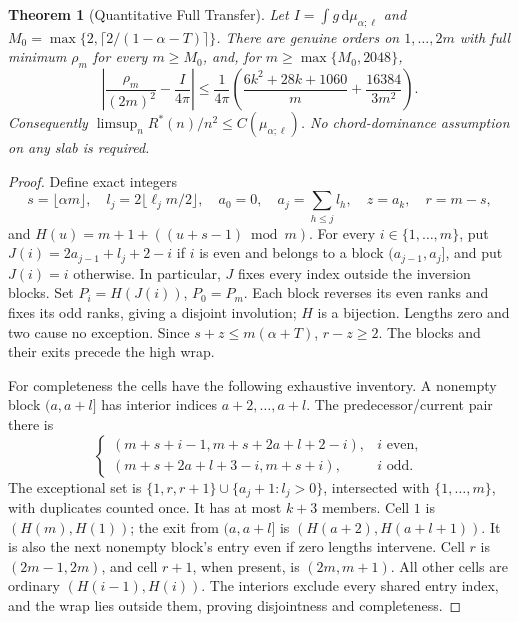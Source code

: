 \documentclass[11pt,letterpaper]{article}
\newtheorem{theorem}{Theorem}[section]
\newcommand{\Rstar}{R^*}
\newcommand{\dd}{\,\mathrm d}
\begin{document}
\begin{theorem}[Quantitative Full Transfer]\label{thm:transfer}
Let $I=\int g\dd\mu_{\alpha;\ell}$ and
$M_0=\max\{2,\lceil2/(1-\alpha-T)\rceil\}$.
There are genuine orders on $1,\ldots,2m$ with full minimum $\rho_m$
for every $m\ge M_0$, and, for $m\ge\max\{M_0,2048\}$,
\begin{equation}\label{eq:radiuserror}
 \left|\frac{\rho_m}{(2m)^2}-\frac I{4\pi}\right|
 \le\frac1{4\pi}\left(\frac{6k^2+28k+1060}{m}
                         +\frac{16384}{3m^2}\right).
\end{equation}
Consequently $\limsup_n\Rstar(n)/n^2\le C(\mu_{\alpha;\ell})$.
No chord-dominance assumption on any slab is required.
\end{theorem}
\begin{proof}
Define exact integers
\[
 s=\lfloor\alpha m\rfloor,\quad l_j=2\lfloor\ell_jm/2\rfloor,
 \quad a_0=0,\quad a_j=\sum_{h\le j}l_h,\quad z=a_k,
 \quad r=m-s,
\]
and $H(u)=m+1+((u+s-1)\bmod m)$. For every $i\in\{1,\ldots,m\}$,
put $J(i)=2a_{j-1}+l_j+2-i$ if $i$ is even and belongs to a block
$(a_{j-1},a_j]$, and put $J(i)=i$ otherwise. In particular, $J$ fixes
every index outside the inversion blocks.
Set $P_i=H(J(i))$, $P_0=P_m$. Each block reverses its even ranks and
fixes its odd ranks, giving a disjoint involution; $H$ is a bijection.
Lengths zero and two cause no exception. Since
$s+z\le m(\alpha+T)$, $r-z\ge2$. The blocks and their exits precede
the high wrap.

For completeness the cells have the following exhaustive inventory.
A nonempty block $(a,a+l]$ has interior indices $a+2,\ldots,a+l$.
The predecessor/current pair there is
\[
 \begin{cases}
 (m+s+i-1,m+s+2a+l+2-i),&i\text{ even},\\
 (m+s+2a+l+3-i,m+s+i),&i\text{ odd}.
 \end{cases}
\]
The exceptional set is
$\{1,r,r+1\}\cup\{a_j+1:l_j>0\}$, intersected with
$\{1,\ldots,m\}$, with duplicates counted once. It has at most $k+3$
members. Cell $1$ is $(H(m),H(1))$; the exit from $(a,a+l]$ is
$(H(a+2),H(a+l+1))$. It is also the next nonempty block's entry even
if zero lengths intervene. Cell $r$ is $(2m-1,2m)$, and cell $r+1$,
when present, is $(2m,m+1)$. All other cells are ordinary
$(H(i-1),H(i))$. The interiors exclude every shared entry index, and
the wrap lies outside them, proving disjointness and completeness.


\end{proof}
\end{document}
